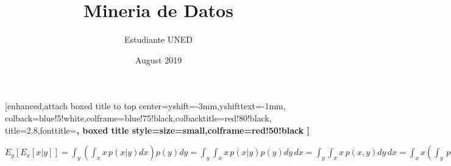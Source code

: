 \documentclass{article}
\title{Mineria de Datos}
\author{Estudiante UNED }
\date{August 2019}
\begin{document}
\maketitle

\begin {tcolorbox}
    [enhanced,attach boxed title to top center={yshift=-3mm,yshifttext=-1mm}, colback=blue!5!white,colframe=blue!75!black,colbacktitle=red!80!black, title=2.8,fonttitle=\bfseries, boxed title style={size=small,colframe=red!50!black} ]
  
\end{tcolorbox}
$ \displaystyle
    E_y\left[E_x\left[x|y\right]\right]=  
    \int_{y} \left( \int_{x}x\,p\left(x|y \right)dx \right)p\left(y \right)dy= 
    \int_{y} \int_{x}x\,p\left(x|y \right)p\left(y \right)dy\,dx =
    \int_{y} \int_{x}x\,p\left(x,y \right)dy\,dx =
    \int_{x} x \left(\int_{y}\,p\left(x,y \right)dy\right)dx =
    \int_{x} p\left(x\right)dx = E\left[x\right]
$ \\
\end{document}
